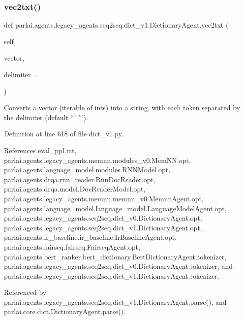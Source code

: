 \subsubsection{\texorpdfstring{vec2txt()}{vec2txt()}}
{\footnotesize\ttfamily def parlai.\+agents.\+legacy\+\_\+agents.\+seq2seq.\+dict\+\_\+v1.\+Dictionary\+Agent.\+vec2txt (\begin{DoxyParamCaption}\item[{}]{self,  }\item[{}]{vector,  }\item[{}]{delimiter = {\ttfamily \textquotesingle{}~\textquotesingle{}} }\end{DoxyParamCaption})}

\begin{DoxyVerb}Converts a vector (iterable of ints) into a string, with each token
separated by the delimiter (default ``' '``).
\end{DoxyVerb}
 

Definition at line 618 of file dict\+\_\+v1.\+py.



References eval\+\_\+ppl.\+int, parlai.\+agents.\+legacy\+\_\+agents.\+memnn.\+modules\+\_\+v0.\+Mem\+N\+N.\+opt, parlai.\+agents.\+language\+\_\+model.\+modules.\+R\+N\+N\+Model.\+opt, parlai.\+agents.\+drqa.\+rnn\+\_\+reader.\+Rnn\+Doc\+Reader.\+opt, parlai.\+agents.\+drqa.\+model.\+Doc\+Reader\+Model.\+opt, parlai.\+agents.\+legacy\+\_\+agents.\+memnn.\+memnn\+\_\+v0.\+Memnn\+Agent.\+opt, parlai.\+agents.\+language\+\_\+model.\+language\+\_\+model.\+Language\+Model\+Agent.\+opt, parlai.\+agents.\+legacy\+\_\+agents.\+seq2seq.\+dict\+\_\+v0.\+Dictionary\+Agent.\+opt, parlai.\+agents.\+legacy\+\_\+agents.\+seq2seq.\+dict\+\_\+v1.\+Dictionary\+Agent.\+opt, parlai.\+agents.\+ir\+\_\+baseline.\+ir\+\_\+baseline.\+Ir\+Baseline\+Agent.\+opt, parlai.\+agents.\+fairseq.\+fairseq.\+Fairseq\+Agent.\+opt, parlai.\+agents.\+bert\+\_\+ranker.\+bert\+\_\+dictionary.\+Bert\+Dictionary\+Agent.\+tokenizer, parlai.\+agents.\+legacy\+\_\+agents.\+seq2seq.\+dict\+\_\+v0.\+Dictionary\+Agent.\+tokenizer, and parlai.\+agents.\+legacy\+\_\+agents.\+seq2seq.\+dict\+\_\+v1.\+Dictionary\+Agent.\+tokenizer.



Referenced by parlai.\+agents.\+legacy\+\_\+agents.\+seq2seq.\+dict\+\_\+v1.\+Dictionary\+Agent.\+parse(), and parlai.\+core.\+dict.\+Dictionary\+Agent.\+parse().

